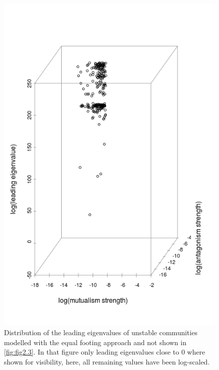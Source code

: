 \begin{figure}[ht]
\centering
\includegraphics[width=.6\textwidth]{./Figures/Appendix2_3/Fig_2.png}
\caption[Additional equal footing eigenvalues]{\color{Gray} Distribution of the leading eigenvalues of unstable communities modelled with the equal footing approach and not shown in \cref{fig:fig2.3}. In that figure only leading eigenvalues close to 0 where shown for visibility, here, all remaining values have been log-scaled.}
\label{fig:figApp2.3.2}
\end{figure}
